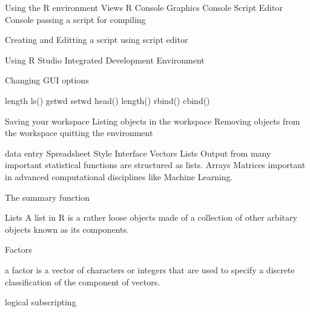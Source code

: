 \documentclass[a4paper,12pt]{article}
\begin{document}
\newpage
Using the R environment
Views R Console
Graphics Console
Script Editor Console
passing a script for compiling

Creating and Editting a script using script editor

Using R Studio Integrated Development Environment

Changing GUI options

length
ls()
getwd
setwd
head()
length()
rbind()
cbind()



Saving your workspace
Listing objects in the workspace
Removing objects from the workspace
quitting the environment

data entry
Spreadsheet Style Interface
Vectors
Lists
Output from many important statistical functions are structured as lists.
Arrays
Matrices important in advanced computational disciplines like Machine Learning.

 
The summary function


Lists
A list in R is a rather loose objects made of a collection of other arbitary objects known as its components. 








Factors

a factor is a vector of characters or integers that are used to specify a discrete classification of the component of vectors.

logical subscripting
\end{document}
